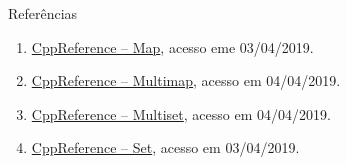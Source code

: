 \begin{frame}[fragile]{Referências}

    \begin{enumerate}
        \item \href{https://en.cppreference.com/w/cpp/container/map}{CppReference -- Map}, acesso eme 03/04/2019.

        \item \href{https://en.cppreference.com/w/cpp/container/multimap}{CppReference -- Multimap}, acesso em 04/04/2019.

        \item \href{https://en.cppreference.com/w/cpp/container/multiset}{CppReference -- Multiset}, acesso em 04/04/2019.

        \item \href{https://en.cppreference.com/w/cpp/container/set}{CppReference -- Set}, acesso em 03/04/2019.
    \end{enumerate}

\end{frame}
